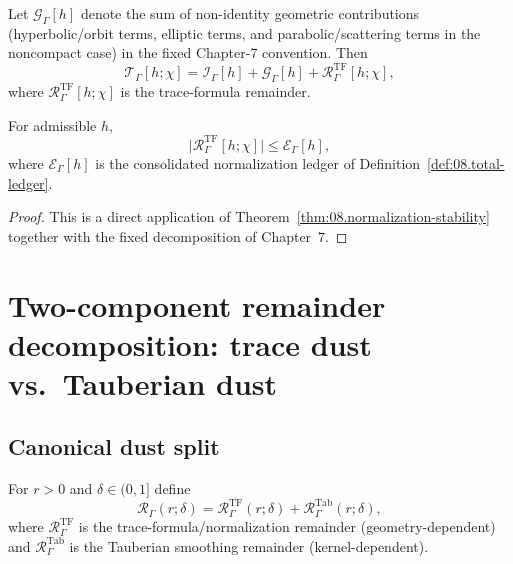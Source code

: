 Let $\mathcal G_\Gamma[h]$ denote the sum of non-identity geometric contributions (hyperbolic/orbit terms, elliptic terms, and
parabolic/scattering terms in the noncompact case) in the fixed Chapter-7 convention. Then
\begin{equation}\label{eq:09.T.decomp}
\mathcal T_\Gamma[h;\chi]=\mathcal I_\Gamma[h]+\mathcal G_\Gamma[h]+\mathcal R^{\mathrm{TF}}_\Gamma[h;\chi],
\end{equation}
where $\mathcal R^{\mathrm{TF}}_\Gamma[h;\chi]$ is the trace-formula remainder.

\begin{proposition}\label{prop:09.trace-formula-remainder}
For admissible $h$,
\begin{equation}\label{eq:09.RTF.bound}
\big|\mathcal R^{\mathrm{TF}}_\Gamma[h;\chi]\big|
\le
\mathcal E_\Gamma[h],
\end{equation}
where $\mathcal E_\Gamma[h]$ is the consolidated normalization ledger of Definition~\ref{def:08.total-ledger}.
\end{proposition}

\begin{proof}
This is a direct application of Theorem~\ref{thm:08.normalization-stability} together with the fixed decomposition of
Chapter~7.
\end{proof}

\section{Two-component remainder decomposition: trace dust vs.\ Tauberian dust}
\label{sec:09.two-dust}

\subsection{Canonical dust split}\label{subsec:09.dust-split}

\begin{definition}\label{def:09.two-component}
For $r>0$ and $\delta\in(0,1]$ define
\[
\mathcal R_\Gamma(r;\delta)=\mathcal R^{\mathrm{TF}}_\Gamma(r;\delta)+\mathcal R^{\mathrm{Tab}}_\Gamma(r;\delta),
\]
where $\mathcal R^{\mathrm{TF}}_\Gamma$ is the trace-formula/normalization remainder (geometry-dependent) and
$\mathcal R^{\mathrm{Tab}}_\Gamma$ is the Tauberian smoothing remainder (kernel-dependent).
\end{definition}

